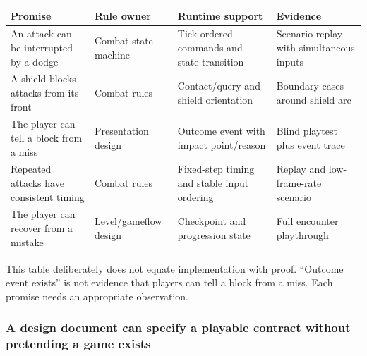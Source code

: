 {\def\LTcaptype{none} %
\begin{longtable}[]{@{}
  >{\raggedright\arraybackslash}p{}
  >{\raggedright\arraybackslash}p{}
  >{\raggedright\arraybackslash}p{}
  >{\raggedright\arraybackslash}p{}@{}}
\toprule\noalign{}
\begin{minipage}[b]{\linewidth}\raggedright
Promise
\end{minipage} & \begin{minipage}[b]{\linewidth}\raggedright
Rule owner
\end{minipage} & \begin{minipage}[b]{\linewidth}\raggedright
Runtime support
\end{minipage} & \begin{minipage}[b]{\linewidth}\raggedright
Evidence
\end{minipage} \\
\midrule\noalign{}
\endhead
\bottomrule\noalign{}
\endlastfoot
An attack can be interrupted by a dodge & Combat state machine & Tick-ordered commands and state transition & Scenario replay with simultaneous inputs \\
A shield blocks attacks from its front & Combat rules & Contact/query and shield orientation & Boundary cases around shield arc \\
The player can tell a block from a miss & Presentation design & Outcome event with impact point/reason & Blind playtest plus event trace \\
Repeated attacks have consistent timing & Combat rules & Fixed-step timing and stable input ordering & Replay and low-frame-rate scenario \\
The player can recover from a mistake & Level/gameflow design & Checkpoint and progression state & Full encounter playthrough \\
\end{longtable}
}

This table deliberately does not equate implementation with proof. ``Outcome event exists'' is not evidence that players can tell a block from a miss. Each promise needs an appropriate observation.

\subsubsection{A design document can specify a playable contract without pretending a game exists}\label{05-engine-i-ch009-a-design-document-can-specify-a-playable-contract-without-pretending-a-game-exists}

